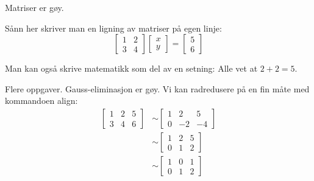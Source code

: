 \documentclass[11pt, a4paper, norsk]{NTNUoving}
\begin{document}



\begin{oppgave} %
  Matriser er gøy.
  \begin{punkt} %
    Sånn her skriver man en ligning av matriser på egen linje:
    \[ %
    \begin{bmatrix} %
    1 & 2\\
    3 & 4
    \end{bmatrix}
    \begin{bmatrix}
    x\\y
    \end{bmatrix}
    =
    \begin{bmatrix}
    5\\
    6
    \end{bmatrix}
    \] %
  
  \end{punkt}
  \begin{punkt}
    Man kan også skrive matematikk som del av en setning: Alle vet at $2+2=5$.
  \end{punkt}
\end{oppgave}

\begin{oppgave}
  Flere oppgaver. Gauss-eliminasjon er gøy. Vi kan radredusere på en fin måte med kommandoen align:
  \begin{align*} %
  \begin{bmatrix}
  1 & 2 & 5\\
  3 & 4 & 6
  \end{bmatrix}
  &\sim %
  \begin{bmatrix}
  1 & 2 & 5\\
  0 & -2 & -4
  \end{bmatrix}
  \\ &\sim %
  \begin{bmatrix}
  1 & 2 & 5\\
  0 & 1 & 2
  \end{bmatrix}
  \\ &\sim
  \begin{bmatrix}
  1 & 0 & 1\\
  0 & 1 & 2
  \end{bmatrix}
  \end{align*}

\end{oppgave}
\end{document}
